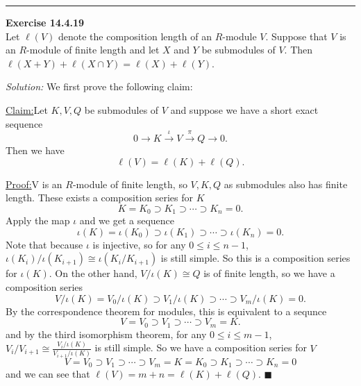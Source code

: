 \documentclass[a4paper, 12pt]{article}
\newenvironment{problem}[2][Exercise]
    { \begin{mdframed}[backgroundcolor=gray!20] \textbf{#1 #2} \\}
    {  \end{mdframed}}
\newenvironment{solution}
    {\textit{Solution:}}
    {}
\newenvironment{claim}[1]{\par\noindent\underline{Claim:}\space#1}{}
\newenvironment{claimproof}[1]{\par\noindent\underline{Proof:}\space#1}{\hfill $\blacksquare$}
\begin{document}
\noindent\rule{7in}{2.8pt}
\newpage 
\begin{problem}{14.4.19}
Let \(\ell(V)\) denote the composition length of an \(R\)-module \(V\). Suppose that \(V\) is an \(R\)-module of finite length and let \(X\) and \(Y\) be submodules of \(V\). Then 
\(\ell(X+Y)+\ell(X\cap Y)=\ell(X)+\ell(Y)\).
\end{problem}
\begin{solution}
We first prove the following claim:
\begin{claim}
Let \(K,V,Q\) be submodules of \(V\) and suppose we have a short exact sequence 
\[0\rightarrow K\xrightarrow{\iota} V\xrightarrow{\pi} Q\rightarrow 0.\]
Then we have 
\[\ell(V)=\ell(K)+\ell(Q).\]
\end{claim}
\begin{claimproof}
V is an \(R\)-module of finite length, so \(V,K,Q\) as submodules also has finite length. These exists a composition series for \(K\) 
\[K=K_0\supset K_1\supset \cdots\supset K_n=0.\]
Apply the map \(\iota\) and we get a sequence 
\[\iota(K)=\iota(K_0)\supset \iota(K_1)\supset \cdots\supset \iota(K_n)=0.\]
Note that because \(\iota\) is injective, so for any \(0\leq i\leq n-1\), \(\iota(K_i)/\iota(K_{i+1})\cong \iota(K_i/K_{i+1})\) is still simple. So this is a 
composition series for \(\iota(K)\). On the other hand, \(V/\iota(K)\cong Q\) is of finite length, so we have a composition series 
\[V/\iota(K)=V_0/\iota(K)\supset V_1/\iota(K)\supset \cdots\supset V_m/\iota(K)=0.\]
By the correspondence theorem for modules, this is equivalent to a sequnce 
\[V=V_0\supset V_1\supset \cdots\supset V_m=K.\]
and by the third isomorphism theorem, for any \(0\leq i\leq m-1\), \(V_i/V_{i+1}\cong \frac{V_i/\iota(K)}{V_{i+1}/\iota(K)}\) is still simple. So we have a composition series for \(V\) 
\[V=V_0\supset V_1\supset \cdots\supset V_m=K=K_0\supset K_1\supset \cdots\supset K_n=0\]
and we can see that \(\ell(V)=m+n=\ell(K)+\ell(Q)\).
\end{claimproof}


\end{solution}
\end{document}
